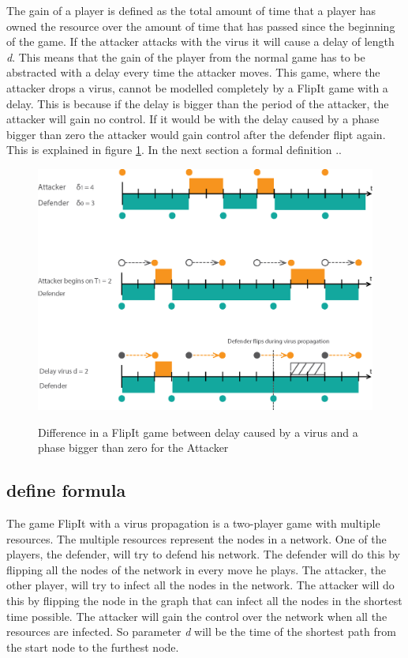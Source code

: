 The gain of a player is defined as the total amount of time that a player has owned the resource over the amount of time that has passed since the beginning of the game. If the attacker attacks with the virus it will cause a delay of length \textit{d}. This means that the gain of the player from the normal game has to be abstracted with a delay every time the attacker moves. This game, where the attacker drops a virus, cannot be modelled completely by a FlipIt game with a delay. This is because if the delay is bigger than the period of the attacker, the attacker will gain no control. If it would be with the delay caused by a phase bigger than zero the attacker would gain control after the defender flipt again. This is explained in figure \ref{fig:virusflip}. In the next section a formal definition .. 

\begin{figure}[hbtp]
\caption{Difference in a FlipIt game between delay caused by a virus and a phase bigger than zero for the Attacker}
\centering
\includegraphics[scale=1]{Images/Flipvirus}
\label{fig:virusflip}
\end{figure}


\subsection{define formula}
The game FlipIt with a virus propagation is a two-player game with multiple resources. The multiple resources represent the nodes in a network. One of the players, the defender, will try to defend his network. The defender will do this by flipping all the nodes of the network in every move he plays. The attacker, the other player, will try to infect all the nodes in the network. The attacker will do this by flipping the node in the graph that can infect all the nodes in the shortest time possible. The attacker will gain the control over the network when all the resources are infected. So parameter \textit{d} will be the time of the shortest path from the start node to the furthest node. \\






